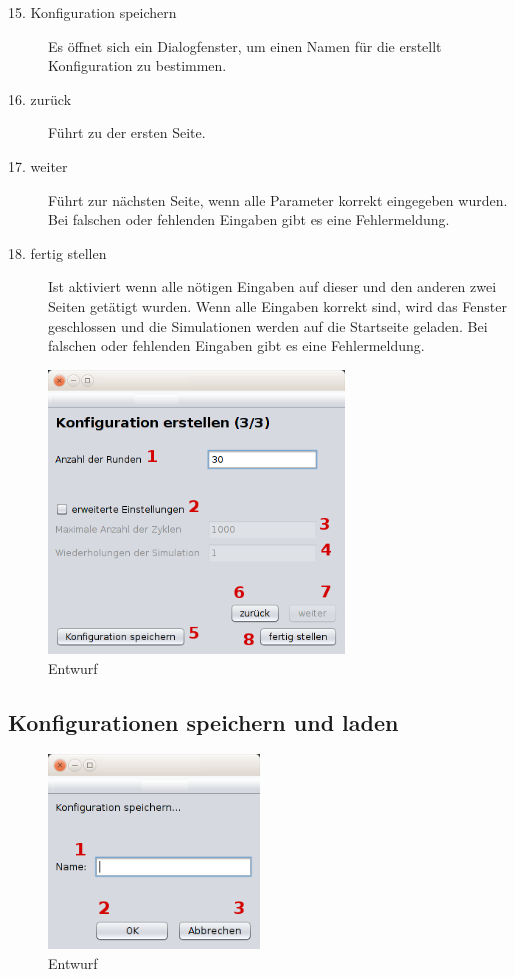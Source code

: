 \begin{description}
\item[15. Konfiguration speichern] Es öffnet sich ein Dialogfenster, um einen Namen für die erstellt Konfiguration zu bestimmen.

\item[16. zurück] Führt zu der ersten Seite.

\item[17. weiter] Führt zur nächsten Seite, wenn alle Parameter korrekt eingegeben wurden. Bei falschen oder fehlenden Eingaben gibt es eine Fehlermeldung.

\item[18. fertig stellen] Ist aktiviert wenn alle nötigen Eingaben auf dieser und den anderen zwei Seiten getätigt wurden. Wenn alle Eingaben korrekt sind, wird das Fenster geschlossen und die Simulationen werden auf die Startseite geladen. Bei falschen oder fehlenden Eingaben gibt es eine Fehlermeldung.

\end{description}

\begin{figure}[htbp] 
  \centering
     \includegraphics[width=0.7\textwidth]{GUI_Entwurf/WizardFenster3.png}
  \caption{Entwurf}
  \label{fig:Bild1}
\end{figure}


\subsection{Konfigurationen speichern und laden}

\begin{figure}[htbp] 
  \centering
     \includegraphics[width=0.5\textwidth]{GUI_Entwurf/KonfigSpeichern.png}
  \caption{Entwurf}
  \label{fig:Bild1}
\end{figure}

